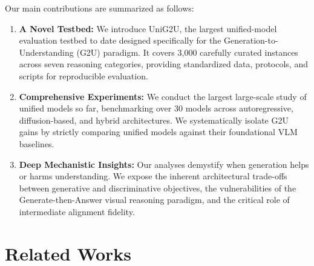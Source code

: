 \documentclass{article}
\theoremstyle{plain}
\theoremstyle{definition}
\theoremstyle{remark}
\begin{document}
Our main contributions are summarized as follows:
\begin{enumerate}
    \item \textbf{A Novel Testbed:} We introduce UniG2U, the largest unified-model evaluation testbed to date designed specifically for the Generation-to-Understanding (G2U) paradigm. It covers 3,000 carefully curated instances across seven reasoning categories, providing standardized data, protocols, and scripts for reproducible evaluation.
    
    \item \textbf{Comprehensive Experiments:} We conduct the largest large-scale study of unified models so far, benchmarking over 30 models across autoregressive, diffusion-based, and hybrid architectures. We systematically isolate G2U gains by strictly comparing unified models against their foundational VLM baselines.
    
    \item \textbf{Deep Mechanistic Insights:} Our analyses demystify when generation helps or harms understanding. We expose the inherent architectural trade-offs between generative and discriminative objectives, the vulnerabilities of the Generate-then-Answer  visual reasoning paradigm, and the critical role of intermediate alignment fidelity.
\end{enumerate}
\section{Related Works}
\end{document}

